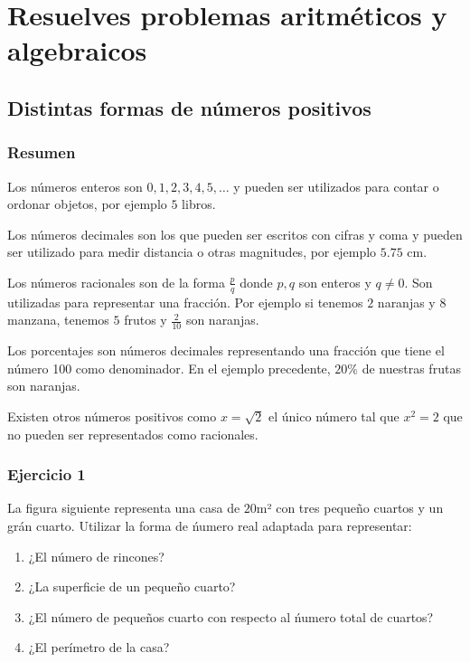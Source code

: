 \chapter{Resuelves problemas aritméticos y algebraicos}

\section{Distintas formas de números positivos}

\subsection*{Resumen}

Los números enteros son $0, 1, 2, 3, 4, 5, \ldots$ y pueden ser utilizados para
contar o ordonar objetos, por ejemplo $5$ libros.

Los números decimales son los que pueden ser escritos con cifras y coma y
pueden ser utilizado para medir distancia o otras magnitudes, por ejemplo
$5.75$ cm.

Los números racionales son de la forma $\frac{p}{q}$ donde $p, q$ son enteros
y $q \neq 0$. Son utilizadas para representar una fracción. Por ejemplo si tenemos
$2$ naranjas y $8$ manzana, tenemos $5$ frutos y $\frac{2}{10}$ son naranjas.

Los porcentajes son números decimales representando una fracción  que tiene el
número 100 como denominador. En el ejemplo precedente, $20\%$ de nuestras frutas
son naranjas.

Existen otros números positivos como $x=\sqrt{2}$ el único número tal que
$x^2 = 2$ que no pueden ser representados como racionales.

\subsection*{Ejercicio 1}

La figura siguiente representa una casa de $20$m² con tres pequeño cuartos y
un grán cuarto. Utilizar la forma de ńumero real adaptada para representar:

\begin{enumerate}
\item ¿El número de rincones?
\item ¿La superficie de un pequeño cuarto?
\item ¿El número de pequeños cuarto con respecto al ńumero total de cuartos?
\item ¿El perímetro de la casa?
\end{enumerate}

